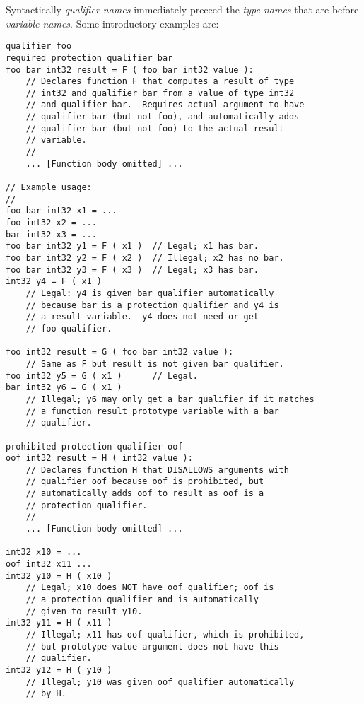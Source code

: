 \documentclass[12pt]{article}
\newenvironment{indpar}[1][0.3in]%
	{\begin{list}{}%
		     {\setlength{\itemsep}{0in}%
		      \setlength{\topsep}{0in}%
		      \setlength{\parsep}{1ex}%
		      \setlength{\labelwidth}{#1}%
		      \setlength{\leftmargin}{#1}%
		      \addtolength{\leftmargin}{\labelsep}}%
	 \item}%
	{\end{list}}
\begin{document}
Syntactically {\em qualifier-names} immediately preceed the {\em type-names}
that are before {\em variable-names}.  Some introductory examples are:
\begin{indpar}\begin{verbatim}
qualifier foo
required protection qualifier bar
foo bar int32 result = F ( foo bar int32 value ):
    // Declares function F that computes a result of type
    // int32 and qualifier bar from a value of type int32
    // and qualifier bar.  Requires actual argument to have
    // qualifier bar (but not foo), and automatically adds
    // qualifier bar (but not foo) to the actual result
    // variable.
    //
    ... [Function body omitted] ...

// Example usage:
//
foo bar int32 x1 = ...
foo int32 x2 = ...
bar int32 x3 = ...
foo bar int32 y1 = F ( x1 )  // Legal; x1 has bar.
foo bar int32 y2 = F ( x2 )  // Illegal; x2 has no bar.
foo bar int32 y3 = F ( x3 )  // Legal; x3 has bar.
int32 y4 = F ( x1 )
    // Legal: y4 is given bar qualifier automatically
    // because bar is a protection qualifier and y4 is
    // a result variable.  y4 does not need or get
    // foo qualifier.

foo int32 result = G ( foo bar int32 value ):
    // Same as F but result is not given bar qualifier.
foo int32 y5 = G ( x1 )      // Legal.
bar int32 y6 = G ( x1 )
    // Illegal; y6 may only get a bar qualifier if it matches
    // a function result prototype variable with a bar
    // qualifier.

prohibited protection qualifier oof
oof int32 result = H ( int32 value ):
    // Declares function H that DISALLOWS arguments with
    // qualifier oof because oof is prohibited, but
    // automatically adds oof to result as oof is a
    // protection qualifier.
    //
    ... [Function body omitted] ...

int32 x10 = ...
oof int32 x11 ...
int32 y10 = H ( x10 )
    // Legal; x10 does NOT have oof qualifier; oof is
    // a protection qualifier and is automatically
    // given to result y10.
int32 y11 = H ( x11 )
    // Illegal; x11 has oof qualifier, which is prohibited,
    // but prototype value argument does not have this
    // qualifier.
int32 y12 = H ( y10 )
    // Illegal; y10 was given oof qualifier automatically
    // by H.
\end{verbatim}\end{indpar}
\end{document}
